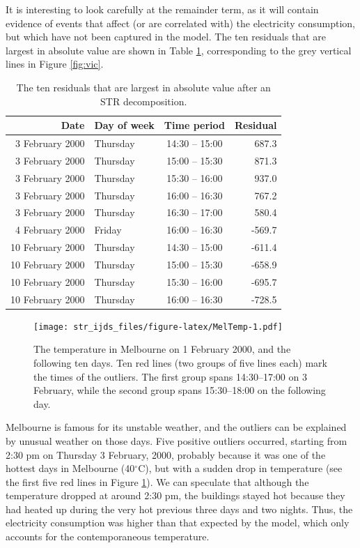 \documentclass[11pt,a4paper,]{article}
\begin{document}
It is interesting to look carefully at the remainder term, as it will contain evidence of events that affect (or are correlated with) the electricity consumption, but which have not been captured in the model. The ten residuals that are largest in absolute value are shown in Table \ref{tab:outlierstable}, corresponding to the grey vertical lines in Figure \ref{fig:vic}.

\begin{table}

\caption{\label{tab:outlierstable}The ten residuals that are largest in absolute value after an STR decomposition.}
\centering
\begin{tabular}[t]{rlcr}
\toprule
Date & Day of week & Time period & Residual\\
\midrule
3 February 2000 & Thursday & 14:30 -- 15:00 & 687.3\\
3 February 2000 & Thursday & 15:00 -- 15:30 & 871.3\\
3 February 2000 & Thursday & 15:30 -- 16:00 & 937.0\\
3 February 2000 & Thursday & 16:00 -- 16:30 & 767.2\\
3 February 2000 & Thursday & 16:30 -- 17:00 & 580.4\\

4 February 2000 & Friday & 16:00 -- 16:30 & -569.7\\
10 February 2000 & Thursday & 14:30 -- 15:00 & -611.4\\
10 February 2000 & Thursday & 15:00 -- 15:30 & -658.9\\
10 February 2000 & Thursday & 15:30 -- 16:00 & -695.7\\
10 February 2000 & Thursday & 16:00 -- 16:30 & -728.5\\
\bottomrule
\end{tabular}
\end{table}

\begin{figure}
\centering
\texttt{[image: str\_ijds\_files/figure-latex/MelTemp-1.pdf]}
\caption{\label{fig:MelTemp}The temperature in Melbourne on 1 February 2000, and the following ten days. Ten red lines (two groups of five lines each) mark the times of the outliers. The first group spans 14:30--17:00 on 3 February, while the second group spans 15:30--18:00 on the following day.}
\end{figure}

Melbourne is famous for its unstable weather, and the outliers can be explained by unusual weather on those days.
Five positive outliers occurred, starting from 2:30 pm on Thursday 3 February, 2000, probably because it was one of the hottest days in Melbourne (40\(^{\circ}\)C), but with a sudden drop in temperature (see the first five red lines in Figure \ref{fig:MelTemp}). We can speculate that although the temperature dropped at around 2:30 pm, the buildings stayed hot because they had heated up during the very hot previous three days and two nights. Thus, the electricity consumption was higher than that expected by the model, which only accounts for the contemporaneous temperature.
\end{document}
